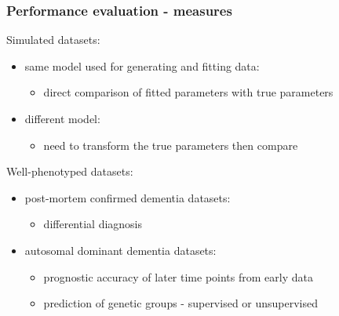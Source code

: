 \documentclass[10pt,xcolor=table]{beamer}
\begin{document}
\begin{frame}
\frametitle{Performance evaluation - measures}


% 
Simulated datasets:
\begin{itemize}
 \item same model used for generating and fitting data:
    \begin{itemize}
    \item \textcolor{parCol}{direct comparison of fitted parameters with true parameters}
    \end{itemize}
 \item different model:
    \begin{itemize}
    \item need to transform the true parameters then compare
    \end{itemize}

\end{itemize}
\vspace{0.5cm}


Well-phenotyped datasets:
\begin{itemize}
  \item post-mortem confirmed dementia datasets: 
  \begin{itemize}
    \item \textcolor{bothCol}{differential diagnosis}
  \end{itemize}
    
  \item autosomal dominant dementia datasets: 
  \begin{itemize}
    \item \textcolor{bothCol}{prognostic accuracy of later time points from early data}
    \item \textcolor{bothCol}{prediction of genetic groups - supervised or unsupervised}
  \end{itemize}
\end{itemize}

\end{frame}
\end{document}
